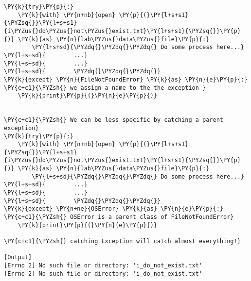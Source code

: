 \begin{Verbatim}[label=\makebox{\url{https://github.com/lucabaldini/cmepda/tree/master/slides/latex/snippets/try\_block.py}},commandchars=\\\{\}]
\PY{k}{try}\PY{p}{:}
    \PY{k}{with} \PY{n+nb}{open} \PY{p}{(}\PY{l+s+s1}{\PYZsq{}}\PY{l+s+s1}{i\PYZus{}do\PYZus{}not\PYZus{}exist.txt}\PY{l+s+s1}{\PYZsq{}}\PY{p}{)} \PY{k}{as} \PY{n}{lab\PYZus{}data\PYZus{}file}\PY{p}{:}
        \PY{l+s+sd}{\PYZdq{}\PYZdq{}\PYZdq{} Do some process here...}
\PY{l+s+sd}{        ...}
\PY{l+s+sd}{        ...}
\PY{l+s+sd}{        \PYZdq{}\PYZdq{}\PYZdq{}}
\PY{k}{except} \PY{n}{FileNotFoundError} \PY{k}{as} \PY{n}{e}\PY{p}{:} \PY{c+c1}{\PYZsh{} we assign a name to the the exception }
    \PY{k}{print}\PY{p}{(}\PY{n}{e}\PY{p}{)}


\PY{c+c1}{\PYZsh{} We can be less specific by catching a parent exception}
\PY{k}{try}\PY{p}{:}
    \PY{k}{with} \PY{n+nb}{open} \PY{p}{(}\PY{l+s+s1}{\PYZsq{}}\PY{l+s+s1}{i\PYZus{}do\PYZus{}not\PYZus{}exist.txt}\PY{l+s+s1}{\PYZsq{}}\PY{p}{)} \PY{k}{as} \PY{n}{lab\PYZus{}data\PYZus{}file}\PY{p}{:}
        \PY{l+s+sd}{\PYZdq{}\PYZdq{}\PYZdq{} Do some process here...}
\PY{l+s+sd}{        ...}
\PY{l+s+sd}{        ...}
\PY{l+s+sd}{        \PYZdq{}\PYZdq{}\PYZdq{}}
\PY{k}{except} \PY{n+ne}{OSError} \PY{k}{as} \PY{n}{e}\PY{p}{:} \PY{c+c1}{\PYZsh{} OSError is a parent class of FileNotFoundError}
    \PY{k}{print}\PY{p}{(}\PY{n}{e}\PY{p}{)}

\PY{c+c1}{\PYZsh{} catching Exception will catch almost everything!}

[Output]
[Errno 2] No such file or directory: 'i_do_not_exist.txt'
[Errno 2] No such file or directory: 'i_do_not_exist.txt'
\end{Verbatim}